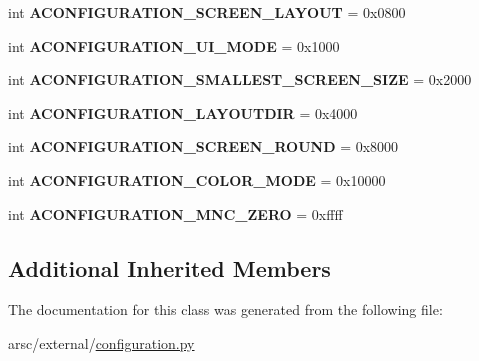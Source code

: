 \begin{DoxyCompactItemize}
\item 
\mbox{\label{classconfiguration_1_1AConfiguration_a558ba56a7c4b10ebdd53c82a8b086de3}} 
int {\bfseries A\+C\+O\+N\+F\+I\+G\+U\+R\+A\+T\+I\+O\+N\+\_\+\+S\+C\+R\+E\+E\+N\+\_\+\+L\+A\+Y\+O\+UT} = 0x0800
\item 
\mbox{\label{classconfiguration_1_1AConfiguration_adfbe13fca195700404b7f62aabfa0e9c}} 
int {\bfseries A\+C\+O\+N\+F\+I\+G\+U\+R\+A\+T\+I\+O\+N\+\_\+\+U\+I\+\_\+\+M\+O\+DE} = 0x1000
\item 
\mbox{\label{classconfiguration_1_1AConfiguration_aadc13b08c90cecfdc37cfac1e6878383}} 
int {\bfseries A\+C\+O\+N\+F\+I\+G\+U\+R\+A\+T\+I\+O\+N\+\_\+\+S\+M\+A\+L\+L\+E\+S\+T\+\_\+\+S\+C\+R\+E\+E\+N\+\_\+\+S\+I\+ZE} = 0x2000
\item 
\mbox{\label{classconfiguration_1_1AConfiguration_ac2e990f1659eac696d3e796a3f0c9d40}} 
int {\bfseries A\+C\+O\+N\+F\+I\+G\+U\+R\+A\+T\+I\+O\+N\+\_\+\+L\+A\+Y\+O\+U\+T\+D\+IR} = 0x4000
\item 
\mbox{\label{classconfiguration_1_1AConfiguration_a9c20146c296ff9d08930a792e24efdf5}} 
int {\bfseries A\+C\+O\+N\+F\+I\+G\+U\+R\+A\+T\+I\+O\+N\+\_\+\+S\+C\+R\+E\+E\+N\+\_\+\+R\+O\+U\+ND} = 0x8000
\item 
\mbox{\label{classconfiguration_1_1AConfiguration_acd0074d303882f54aa50ccdfce734ee3}} 
int {\bfseries A\+C\+O\+N\+F\+I\+G\+U\+R\+A\+T\+I\+O\+N\+\_\+\+C\+O\+L\+O\+R\+\_\+\+M\+O\+DE} = 0x10000
\item 
\mbox{\label{classconfiguration_1_1AConfiguration_ad3513e2b88c1a5904ec99b65ab3476d7}} 
int {\bfseries A\+C\+O\+N\+F\+I\+G\+U\+R\+A\+T\+I\+O\+N\+\_\+\+M\+N\+C\+\_\+\+Z\+E\+RO} = 0xffff
\end{DoxyCompactItemize}
\subsection*{Additional Inherited Members}


The documentation for this class was generated from the following file\+:\begin{DoxyCompactItemize}
\item 
arsc/external/\mbox{\hyperlink{configuration_8py}{configuration.\+py}}\end{DoxyCompactItemize}
